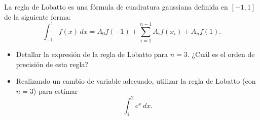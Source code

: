 \begin{EjerciciosPropuestos}
  \begin{problema}
    La regla de Lobatto es una fórmula de cuadratura gaussiana
    definida en $[-1,1]$ de la siguiente forma:
    \begin{equation*}
      \int_{-1}^1 f(x)\, dx = A_0 f(-1) + \sum_{i=1}^{n-1} A_if(x_i) +
      A_nf(1).
    \end{equation*}
    \begin{itemize}
    \item Detallar la expresión de la regla de Lobatto para
      $n=3$. ¿Cuál es el orden de precisión de esta regla?
    \item Realizando un cambio de variable adecuado, utilizar la regla
      de Lobatto (con $n=3$) para estimar
      \begin{equation*}
        \int_1^2 e^x\, dx.
      \end{equation*}
    \end{itemize}
  \end{problema}
\end{EjerciciosPropuestos}




